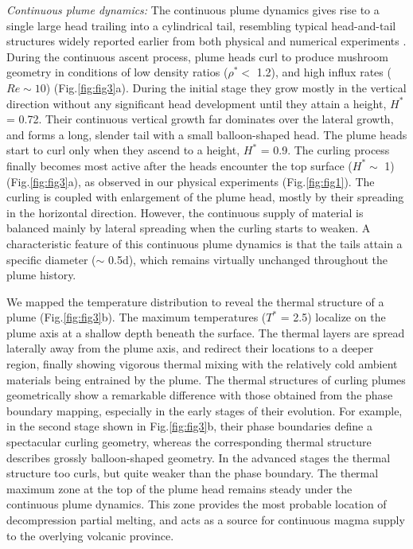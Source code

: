 \documentclass[12pt]{article}
\begin{document}
{\textit{Continuous plume dynamics:} The continuous plume dynamics gives rise to a single large head trailing into a cylindrical tail, resembling typical head-and-tail structures widely reported earlier from both physical and numerical experiments \cite{van1997evolution, farnetani2002mixing, lin2006dynamics1}. During the continuous ascent process, plume heads curl to produce mushroom geometry in conditions of low density ratios ($\rho^*<$ 1.2), and high influx rates ($Re\sim 10$) (Fig.\ref{fig:fig3}a). 
During the initial stage they grow mostly in the vertical direction without any significant head development until they attain a height, 
$H^*$ = 0.72. Their continuous vertical growth far dominates over the lateral growth, and forms a long, slender tail with a small balloon-shaped head. The plume heads start to curl only when they ascend to a height, $H^*$ = 0.9. The curling process finally becomes most active after the heads encounter the top surface ($H^* \sim$  1) (Fig.\ref{fig:fig3}a), as observed in our physical experiments 
(Fig.\ref{fig:fig1}).  The curling is coupled with enlargement of the plume head, mostly by their spreading in the horizontal direction. However, the continuous supply of material is balanced mainly by lateral spreading when the curling starts to weaken. A characteristic feature of this continuous plume dynamics is that the tails attain a specific diameter 
($\sim$ 0.5d), which remains virtually unchanged throughout the plume history.


We mapped the temperature distribution to reveal the thermal structure of a plume  (Fig.\ref{fig:fig3}b). 
 The maximum temperatures ($T^*$ = 2.5) localize on the plume axis at a shallow depth beneath the surface. The thermal layers are spread laterally away from the plume axis, and redirect their locations to a deeper region, finally showing vigorous thermal mixing with the relatively cold ambient materials being entrained by the plume. The thermal structures of curling plumes geometrically show a remarkable difference with those obtained from the phase boundary mapping, especially in the early stages of their evolution. For example, in the second stage shown in Fig.\ref{fig:fig3}b, their phase boundaries define a spectacular curling geometry, whereas the corresponding thermal structure describes grossly balloon-shaped geometry. In the advanced stages the thermal structure too curls, but quite weaker than the phase boundary. The thermal maximum zone at the top of the plume head remains steady under the continuous plume dynamics. This zone provides the most probable location of decompression partial melting, and acts as a source for continuous magma supply to the overlying volcanic province.



}
\end{document}
